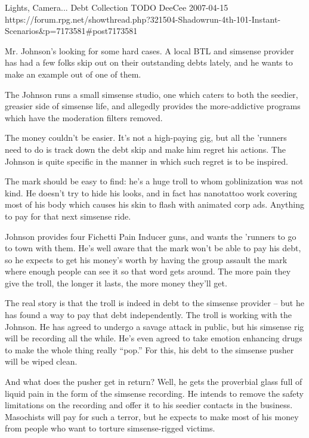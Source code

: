 \begin{scenario}{Lights, Camera...}
	{Debt Collection}
	{TODO}
	{DeeCee}
	{2007-04-15}
	{https://forum.rpg.net/showthread.php?321504-Shadowrun-4th-101-Instant-Scenarios\&p=7173581\#post7173581}

  Mr. Johnson's looking for some hard cases. A local BTL and simsense provider has had a few folks skip out on their outstanding debts lately, and he wants to make an example out of one of them.

The Johnson runs a small simsense studio, one which caters to both the seedier, greasier side of simsense life, and allegedly provides the more-addictive programs which have the moderation filters removed.

\synopsis  The money couldn't be easier. It's not a high-paying gig, but all the 'runners need to do is track down the debt skip and make him regret his actions. The Johnson is quite specific in the manner in which such regret is to be inspired.

The mark should be easy to find: he's a huge troll to whom goblinization was not kind. He doesn't try to hide his looks, and in fact has nanotattoo work covering most of his body which causes his skin to flash with animated corp ads. Anything to pay for that next simsense ride.

Johnson provides four Fichetti Pain Inducer guns, and wants the 'runners to go to town with them. He's well aware that the mark won't be able to pay his debt, so he expects to get his money's worth by having the group assault the mark where enough people can see it so that word gets around. The more pain they give the troll, the longer it lasts, the more money they'll get.

\notes  The real story is that the troll is indeed in debt to the simsense provider – but he has found a way to pay that debt independently. The troll is working with the Johnson. He has agreed to undergo a savage attack in public, but his simsense rig will be recording all the while. He's even agreed to take emotion enhancing drugs to make the whole thing really ``pop.'' For this, his debt to the simsense pusher will be wiped clean.

And what does the pusher get in return? Well, he gets the proverbial glass full of liquid pain in the form of the simsense recording. He intends to remove the safety limitations on the recording and offer it to his seedier contacts in the business. Masochists will pay for such a terror, but he expects to make most of his money from people who want to torture simsense-rigged victims.


\end{scenario}
